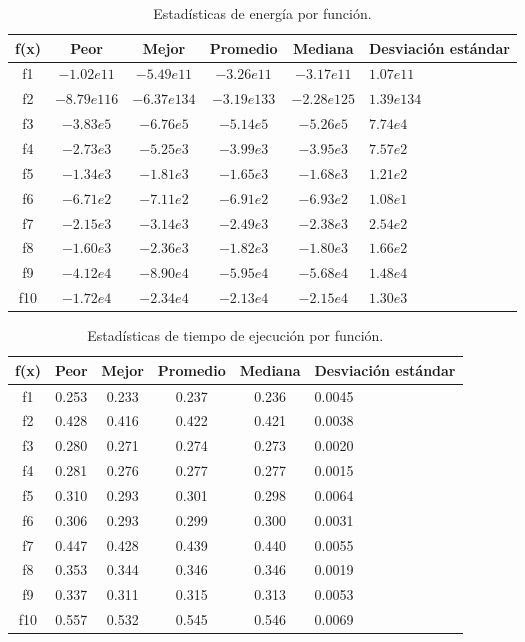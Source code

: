 \begin{table}[h!]
	\centering
	\begin{tabular}{|c|c|c|c|c|p{2.1cm}|}  
		\hline
		\textbf{f(x)} & \textbf{Peor} & \textbf{Mejor} & \textbf{Promedio} & \textbf{Mediana} & \textbf{Desviación estándar} \\  
		\hline
		f1  & \(-1.02e{11}\) & \(-5.49e{11}\) & \(-3.26e{11}\) & \(-3.17e{11}\) & \(1.07e{11}\) \\ 
		f2  & \(-8.79e{116}\) & \(-6.37e{134}\) & \(-3.19e{133}\) & \(-2.28e{125}\) & \(1.39e{134}\) \\ 
		f3  & \(-3.83e{5}\) & \(-6.76e{5}\) & \(-5.14e{5}\) & \(-5.26e{5}\) & \(7.74e{4}\) \\ 
		f4  & \(-2.73e{3}\) & \(-5.25e{3}\) & \(-3.99e{3}\) & \(-3.95e{3}\) & \(7.57e{2}\) \\ 
		f5  & \(-1.34e{3}\) & \(-1.81e{3}\) & \(-1.65e{3}\) & \(-1.68e{3}\) & \(1.21e{2}\) \\ 
		f6  & \(-6.71e{2}\) & \(-7.11e{2}\) & \(-6.91e{2}\) & \(-6.93e{2}\) & \(1.08e{1}\) \\ 
		f7  & \(-2.15e{3}\) & \(-3.14e{3}\) & \(-2.49e{3}\) & \(-2.38e{3}\) & \(2.54e{2}\) \\ 
		f8  & \(-1.60e{3}\) & \(-2.36e{3}\) & \(-1.82e{3}\) & \(-1.80e{3}\) & \(1.66e{2}\) \\ 
		f9  & \(-4.12e{4}\) & \(-8.90e{4}\) & \(-5.95e{4}\) & \(-5.68e{4}\) & \(1.48e{4}\) \\ 
		f10 & \(-1.72e{4}\) & \(-2.34e{4}\) & \(-2.13e{4}\) & \(-2.15e{4}\) & \(1.30e{3}\) \\
		\hline
	\end{tabular}
	\caption{Estadísticas de energía por función.}
	\label{tab:res_cec_res}
\end{table}

\begin{table}[H]
	\centering
	\begin{tabular}{|c|c|c|c|c|p{2.1cm}|}  
		\hline
		\textbf{f(x)} & \textbf{Peor} & \textbf{Mejor} & \textbf{Promedio} & \textbf{Mediana} & \textbf{Desviación estándar} \\  
		\hline
		f1  & 0.253 & 0.233 & 0.237 & 0.236 & 0.0045 \\ 
		f2  & 0.428 & 0.416 & 0.422 & 0.421 & 0.0038 \\ 
		f3  & 0.280 & 0.271 & 0.274 & 0.273 & 0.0020 \\ 
		f4  & 0.281 & 0.276 & 0.277 & 0.277 & 0.0015 \\ 
		f5  & 0.310 & 0.293 & 0.301 & 0.298 & 0.0064 \\ 
		f6  & 0.306 & 0.293 & 0.299 & 0.300 & 0.0031 \\ 
		f7  & 0.447 & 0.428 & 0.439 & 0.440 & 0.0055 \\ 
		f8  & 0.353 & 0.344 & 0.346 & 0.346 & 0.0019 \\ 
		f9  & 0.337 & 0.311 & 0.315 & 0.313 & 0.0053 \\ 
		f10 & 0.557 & 0.532 & 0.545 & 0.546 & 0.0069 \\
		\hline
	\end{tabular}
	\caption{Estadísticas de tiempo de ejecución por función.}
	\label{tab:res_cec_time}
\end{table}



